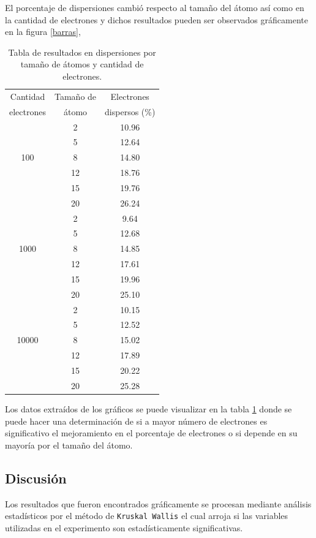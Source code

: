 \documentclass[3pt,twocolumn]{elsarticle}
\begin{document}
El porcentaje de dispersiones cambió respecto al tamaño del átomo así como en la cantidad de electrones y dichos resultados pueden ser observados gráficamente en la figura \ref{barras}, 

\begin{table}[h!]
    \centering
    \caption{Tabla de resultados en dispersiones por tamaño de átomos y cantidad de electrones.}
    \begin{tabular}{|c|c|c|}
       \hline
        Cantidad & Tamaño de & Electrones\\
       electrones& átomo & dispersos (\%) \\
       \hline
       & 2 & 10.96 \\
       & 5 & 12.64 \\
       100& 8 & 14.80 \\
       & 12 & 18.76 \\
       & 15 & 19.76 \\
       & 20 & 26.24 \\
       \hline
       & 2 &9.64\\
       & 5 & 12.68 \\
       1000& 8 & 14.85 \\
       & 12 & 17.61 \\
       & 15 & 19.96 \\
       & 20 & 25.10\\
       \hline
       & 2 & 10.15\\
       & 5 & 12.52\\
       10000& 8 & 15.02 \\
       & 12 & 17.89\\
       & 15 & 20.22\\
       & 20 & 25.28\\
       \hline
    \end{tabular}
    \label{tabla1}
\end{table} 

Los datos extraídos de los gráficos se puede visualizar en la tabla \ref{tabla1} donde se puede hacer una determinación de si a mayor número de electrones es significativo el mejoramiento en el porcentaje de electrones o si depende en su mayoría por el tamaño del átomo.

\subsection{Discusión}
Los resultados que fueron encontrados gráficamente se procesan mediante análisis estadísticos por el método de \texttt{Kruskal Wallis} el cual arroja si las variables utilizadas en el experimento son estadísticamente significativas.
\end{document}
